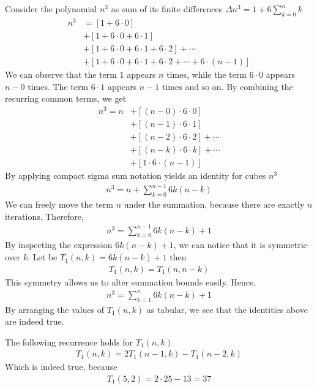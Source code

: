 Consider the polynomial $n^3$ as sum of its finite differences
$\Delta n^3 = 1 +  6 \sum_{k=0}^{n} k$
\begin{align*}
    n^3
    &= [1+6\cdot0] \\
    &+ [1+6\cdot0+6\cdot1] \\
    &+ [1+6\cdot0+6\cdot1+6\cdot2] + \cdots \\
    &+ [1+6\cdot0+6\cdot1+6\cdot2+\cdots+6\cdot(n-1)]
\end{align*}
We can observe that the term $1$ appears $n$ times, while the term $6\cdot0$ appears $n-0$ times.
The term $6\cdot1$ appears $n-1$ times and so on.
By combining the recurring common terms, we get
\begin{align*}
    n^3 = n
    &+ [(n-0) \cdot 6 \cdot 0] \\
    &+ [(n-1)\cdot6\cdot1] \\
    &+ [(n-2)\cdot6\cdot2] + \cdots \\
    &+ [(n-k)\cdot 6 \cdot k] + \cdots \\
    &+ [1\cdot6\cdot(n-1)]
\end{align*}
By applying compact sigma sum notation yields an identity for cubes $n^3$
\begin{align*}
    n^3 = n + \sum_{k=0}^{n-1} 6k(n-k)
\end{align*}
We can freely move the term $n$ under the summation, because there are exactly $n$ iterations.
Therefore,
\begin{align*}
    n^3 = \sum_{k=0}^{n-1} 6k(n-k) + 1
\end{align*}
By inspecting the expression $6k(n-k) + 1$, we can notice that it is symmetric over $k$.
Let be $T_{1} (n,k) = 6k(n-k) + 1$ then
\begin{align*}
    T_{1} (n,k) = T_{1} (n,n-k)
\end{align*}
This symmetry allows us to alter summation bounds easily.
Hence,
\begin{align*}
    n^3 = \sum_{k=1}^{n} 6k(n-k) + 1
\end{align*}
By arranging the values of $T_{1} (n,k)$ as tabular, we see that the identities above are indeed true.

The following recurrence holds for $T_{1} (n,k)$
\begin{align*}
    T_{1} (n, k) = 2T_{1} (n-1, k) - T_{1} (n-2, k)
\end{align*}
Which is indeed true, because
\begin{align*}
    T_{1} (5, 2) = 2 \cdot 25 - 13 = 37
\end{align*}
